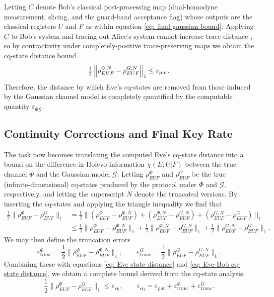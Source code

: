 ﻿\documentclass[12pt]{article}
\begin{document}
Letting $C$ denote Bob's classical post-processing map (dual-homodyne measurement, slicing, and the guard-band acceptance flag) whose outputs are the classical registers $U$ and $F$ as within equation \eqref{eq: final gaussian bound}. Applying $C$ to Bob's system and tracing out Alice's system cannot increase trace distance \cite{Watrous-2018}, so by contractivity under completely-positive trace-preserving maps we obtain the cq-state distance bound
\begin{equation}
\label{eq: Eve-Bob cq-state distance}
\tfrac{1}{2}\left\|\rho_{EUF}^{\Phi,N}-\rho_{EUF}^{G,N}\right\|_1 \le \varepsilon_{\rm pur}.
\end{equation}
Therefore, the distance by which Eve's cq-states are removed from those induced by the Gaussian channel model is completely quantified by the computable quantity $\varepsilon_{\Phi \mathcal{G}}$.

\subsection{Continuity Corrections and Final Key Rate}
\label{subsec: continuity corrections and final key rate}

The task now becomes translating the computed Eve's cq-state distance into a bound on the difference in Holevo information $\chi(E;U|F)$ between the true channel $\Phi$ and the Gaussian model $\mathcal{G}$. Letting $\rho_{EUF}^\Phi$ and $\rho_{EUF}^G$ be the true (infinite-dimensional) cq-states produced by the protocol under $\Phi$ and $\mathcal{G}$, respectively, and letting the superscript $N$ denote the truncated versions. By inserting the cq-states and applying the triangle inequality we find that
\begin{align}
  \label{eq: long one}
\tfrac12\|\rho^\Phi_{EUF}-\rho^G_{EUF}\|_1
&=\tfrac12\|(\rho^\Phi_{EUF}-\rho^{\Phi,N}_{EUF})+(\rho^{\Phi,N}_{EUF}-\rho^{G,N}_{EUF})
+(\rho^{G,N}_{EUF}-\rho^G_{EUF})\|_1 \nonumber\\
&\le \tfrac12\|\rho^\Phi_{EUF}-\rho^{\Phi,N}_{EUF}\|_1
+ \tfrac12\|\rho^{\Phi,N}_{EUF}-\rho^{G,N}_{EUF}\|_1
+ \tfrac12\|\rho^{G,N}_{EUF}-\rho^G_{EUF}\|_1.
\end{align}
We may then define the truncation errors
\begin{equation}
\varepsilon_{\mathrm{trunc}}^{\Phi} = \frac12\|\rho^\Phi_{EUF}-\rho^{\Phi,N}_{EUF}\|_1, 
\qquad
\varepsilon_{\mathrm{trunc}}^{G} = \frac12\|\rho^G_{EUF}-\rho^{G,N}_{EUF}\|_1.
\end{equation}
Combining these with equations \eqref{eq: Eve state distance} and \eqref{eq: Eve-Bob cq-state distance}, we obtain a complete bound derived from the cq-state analysis:
\begin{equation}
\frac12\|\rho^\Phi_{EUF}-\rho^G_{EUF}\|_1 \le \varepsilon_{\mathrm{cq}},
\qquad
\varepsilon_{\mathrm{cq}} = \varepsilon_{\mathrm{pur}} + \varepsilon_{\mathrm{trunc}}^{\Phi} + \varepsilon_{\mathrm{trunc}}^{G}.
\end{equation}
\end{document}
